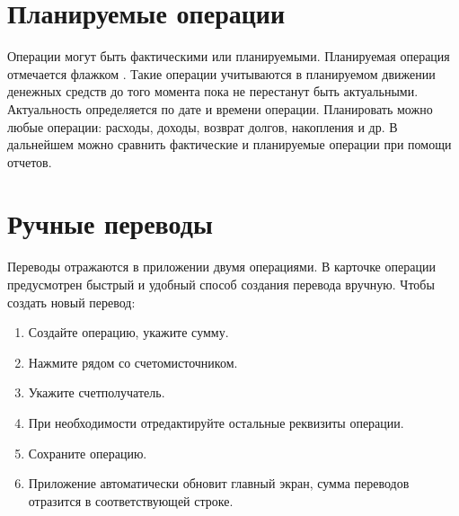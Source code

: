\documentclass[a4paper,10pt,russian]{sphinxmanual}
\begin{document}
\noindent{}

\noindent{}

\noindent{}

\noindent{}

\noindent{}


\section{Планируемые операции}
\label{\detokenize{transactions:id4}}
\sphinxAtStartPar
Операции могут быть фактическими или планируемыми. Планируемая операция отмечается флажком . Такие операции
учитываются в планируемом движении денежных средств до того момента пока не перестанут быть актуальными.
Актуальность определяется по дате и времени операции. Планировать можно любые операции: расходы, доходы,
возврат долгов, накопления и др. В дальнейшем можно сравнить фактические и планируемые операции при помощи отчетов.

\noindent{}


\section{Ручные переводы}
\label{\detokenize{transactions:id5}}
\sphinxAtStartPar
Переводы отражаются в приложении двумя операциями. В карточке операции предусмотрен быстрый и удобный способ
создания перевода вручную. Чтобы создать новый перевод:
\begin{enumerate}
%
\item {} 
\sphinxAtStartPar
Создайте операцию, укажите сумму.

\item {} 
\sphinxAtStartPar
Нажмите  рядом со счетом\sphinxhyphen{}источником.

\item {} 
\sphinxAtStartPar
Укажите счет\sphinxhyphen{}получатель.

\item {} 
\sphinxAtStartPar
При необходимости отредактируйте остальные реквизиты операции.

\item {} 
\sphinxAtStartPar
Сохраните операцию.

\item {} 
\sphinxAtStartPar
Приложение автоматически обновит главный экран, сумма переводов отразится в соответствующей строке.

\end{enumerate}
\end{document}
